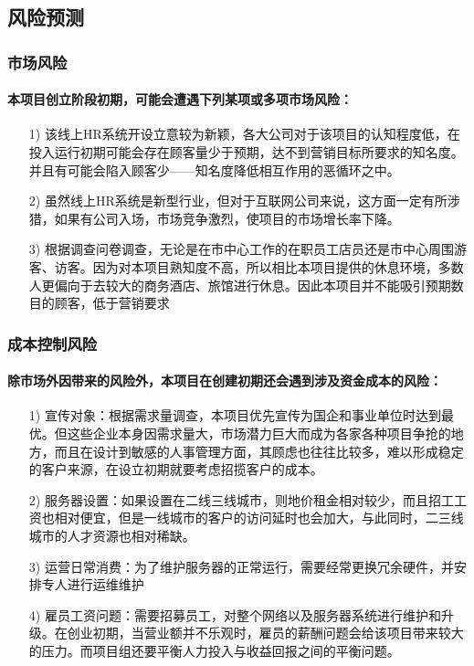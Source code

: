 \documentclass[a4,UTF8]{ctexart}
\begin{document}
\subsection{风险预测}
\subsubsection{市场风险}
\paragraph{本项目创立阶段初期，可能会遭遇下列某项或多项市场风险：}
\begin{itemize}
\item [1)] 
该线上HR系统开设立意较为新颖，各大公司对于该项目的认知程度低，在投入运行初期可能会存在顾客量少于预期，达不到营销目标所要求的知名度。并且有可能会陷入顾客少——知名度降低相互作用的恶循环之中。

\item [2)] 
 虽然线上HR系统是新型行业，但对于互联网公司来说，这方面一定有所涉猎，如果有公司入场，市场竞争激烈，使项目的市场增长率下降。

\item [3)]
根据调查问卷调查，无论是在市中心工作的在职员工店员还是市中心周围游客、访客。因为对本项目熟知度不高，所以相比本项目提供的休息环境，多数人更偏向于去较大的商务酒店、旅馆进行休息。因此本项目并不能吸引预期数目的顾客，低于营销要求
\end{itemize}
\subsubsection{成本控制风险}
\paragraph{除市场外因带来的风险外，本项目在创建初期还会遇到涉及资金成本的风险：}
\begin{itemize}

\item[1)]宣传对象：根据需求量调查，本项目优先宣传为国企和事业单位时达到最优。但这些企业本身因需求量大，市场潜力巨大而成为各家各种项目争抢的地方，而且在设计到敏感的人事管理方面，其顾虑也往往比较多，难以形成稳定的客户来源，在设立初期就要考虑招揽客户的成本。


\item[2)]服务器设置：如果设置在二线三线城市，则地价租金相对较少，而且招工工资也相对便宜，但是一线城市的客户的访问延时也会加大，与此同时，二三线城市的人才资源也相对稀缺。


\item[3)]运营日常消费：为了维护服务器的正常运行，需要经常更换冗余硬件，并安排专人进行运维维护


\item[4)]雇员工资问题：需要招募员工，对整个网络以及服务器系统进行维护和升级。在创业初期，当营业额并不乐观时，雇员的薪酬问题会给该项目带来较大的压力。而项目组还要平衡人力投入与收益回报之间的平衡问题。
\end{itemize}
\end{document}
